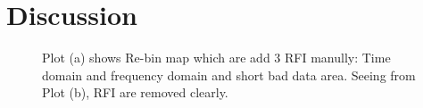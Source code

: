 \documentclass[iop]{emulateapj}
\begin{document}
\section{Discussion}

\begin{figure}[ht!]
\centering
{}
\caption{Plot (a) shows Re-bin map which are add 3 RFI manully: Time domain and frequency domain and short bad data area. Seeing from Plot (b), RFI are removed clearly.  \label{fig:RFI remove}}
\end{figure}


	

 
\end{document}
